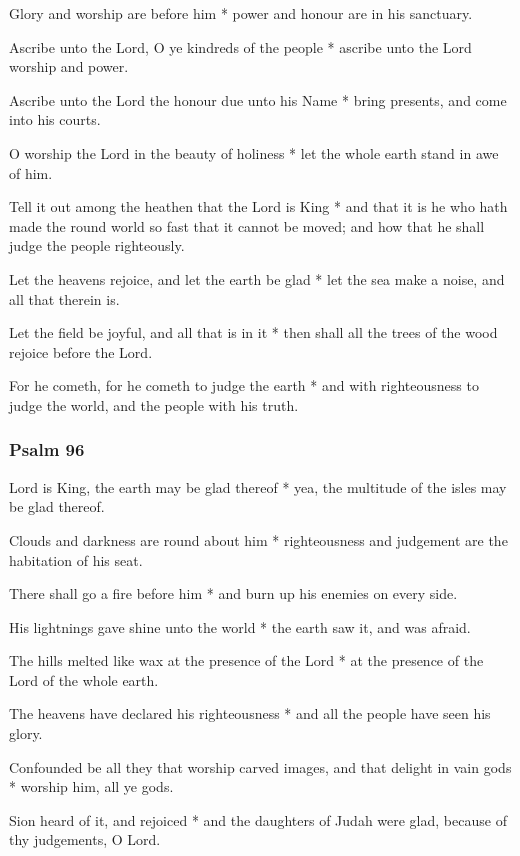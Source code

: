 Glory and worship are before him * power and honour are in his sanctuary.

Ascribe unto the Lord, O ye kindreds of the people * ascribe unto the Lord worship and power.

Ascribe unto the Lord the honour due unto his Name * bring presents, and come into his courts.

O worship the Lord in the beauty of holiness * let the whole earth stand in awe of him.

Tell it out among the heathen that the Lord is King * and that it is he who hath made the round world so fast that it cannot be moved; and how that he shall judge the people righteously.

Let the heavens rejoice, and let the earth be glad * let the sea make a noise, and all that therein is.

Let the field be joyful, and all that is in it * then shall all the trees of the wood rejoice before the Lord.

For he cometh, for he cometh to judge the earth * and with righteousness to judge the world, and the people with his truth.

\subsubsection{Psalm 96}


 Lord is King, the earth may be glad thereof * yea, the multitude of the isles may be glad thereof.

Clouds and darkness are round about him * righteousness and judgement are the habitation of his seat.

There shall go a fire before him * and burn up his enemies on every side.

His lightnings gave shine unto the world * the earth saw it, and was afraid.

The hills melted like wax at the presence of the Lord * at the presence of the Lord of the whole earth.

The heavens have declared his righteousness * and all the people have seen his glory.

Confounded be all they that worship carved images, and that delight in vain gods * worship him, all ye gods.

Sion heard of it, and rejoiced * and the daughters of Judah were glad, because of thy judgements, O Lord.

